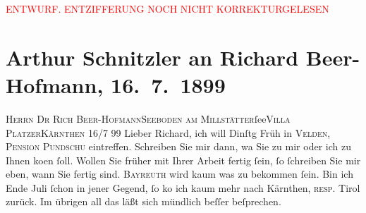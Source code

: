 
\begin{center}
            \textcolor{red}{ENTWURF. ENTZIFFERUNG NOCH NICHT KORREKTURGELESEN}
                      \end{center}
            
               \section[Arthur Schnitzler an Richard Beer-Hofmann, 16. 7. 1899]{ Arthur Schnitzler an Richard Beer-Hofmann, 16. 7. 1899}\nopagebreak{}\rehead{ }\begin{ledgroupsized}[t]{13cm}\normalsize\beginnumbering{} \toendnotes[C]{\smallbreak\pagebreak[2]} 
\pstart{}{\pb}\textsc{Herrn Dr Rich Beer-Hofmann}\pend{}\pstart{}\textsc{Seeboden am Millstätter}ſee\pend{}\pstart{}\textsc{Villa Platzer}\pend{}\pstart{}\textsc{Kärnthen}\pend{}{\bigskip}\pstart
           \raggedleft{}{\pb}16/7 99\pend
           \pstart
           Lieber Richard, ich will Dinſtg{ }Früh in \textsc{Velden}, \textsc{Pension Pundschu} eintreffen. Schreiben Sie mir dann, wa{\geminationn} Sie zu mir oder ich zu Ihnen ko{\geminationm}en ſoll. {\pb}Wollen Sie
               früher mit Ihrer Arbeit fertig ſein, ſo ſchreiben Sie mir eben, wann Sie fertig
               sind.\pend
           \pstart
           \textsc{Bayreuth} wird kaum {\pb}was zu bekommen ſein.\pend
           \pstart
           Bin ich Ende Juli{ }ſchon in jener Gegend, ſo ko{\geminationm} ich kaum mehr nach Kärnthen, \textsc{resp}. Tirol zurück. Im übrigen all das läßt sich mündlich {\pb}beſſer beſprechen.\pend

\end{ledgroupsized}
